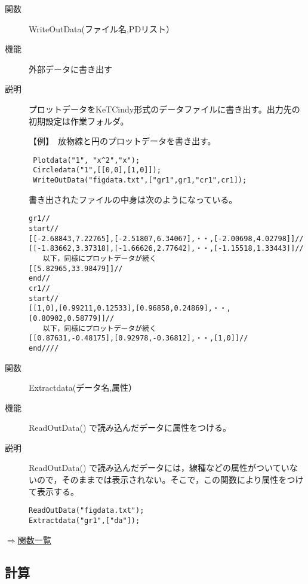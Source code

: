 \documentclass[papersize,a4paper,10pt,uplatex]{jsarticle}
\begin{document}
\begin{description}
\vspace{\baselineskip}
\hypertarget{writeoutdata}{}
\item[関数]WriteOutData(ファイル名,PDリスト）
\item[機能]外部データに書き出す
\item[説明]プロットデータをKeTCindy形式のデータファイルに書き出す。出力先の 初期設定は作業フォルダ。

【例】　放物線と円のプロットデータを書き出す。

\begin{verbatim}
 Plotdata("1", "x^2","x");
 Circledata("1",[[0,0],[1,0]]);
 WriteOutData("figdata.txt",["gr1",gr1,"cr1",cr1]);
\end{verbatim}

書き出されたファイルの中身は次のようになっている。

\begin{verbatim}
gr1// 
start//
[[-2.68843,7.22765],[-2.51807,6.34067],・・,[-2.00698,4.02798]]//
[[-1.83662,3.37318],[-1.66626,2.77642],・・,[-1.15518,1.33443]]//
　　以下，同様にプロットデータが続く
[[5.82965,33.98479]]//
end//
cr1//
start//
[[1,0],[0.99211,0.12533],[0.96858,0.24869],・・,[0.80902,0.58779]]//
　　以下，同様にプロットデータが続く
[[0.87631,-0.48175],[0.92978,-0.36812],・・,[1,0]]//
end////
\end{verbatim}

\vspace{\baselineskip}
\hypertarget{extractdata}{}
\item[関数]Extractdata(データ名,属性）
\item[機能]ReadOutData() で読み込んだデータに属性をつける。
\item[説明]ReadOutData() で読み込んだデータには，線種などの属性がついていないので，そのままでは表示されない。そこで，この関数により属性をつけて表示する。
\begin{verbatim}
ReadOutData("figdata.txt");
Extractdata("gr1",["da"]);
\end{verbatim}

\end{description}
\begin{flushright}\hyperlink{functionlist}{$\Rightarrow$関数一覧}\end{flushright}

\subsection{計算}
\end{document}
